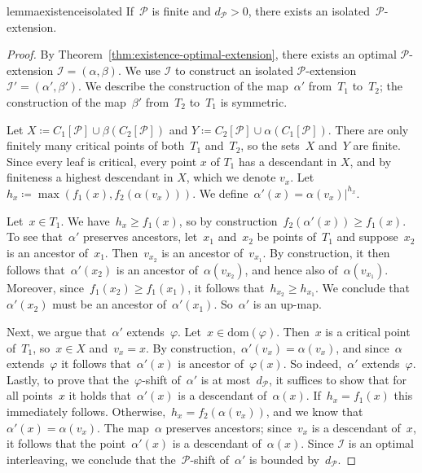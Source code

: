 \documentclass[a4paper,UKenglish, autoref, thm-restate, cleveref]{lipics-v2021}
\newcommand{\dom}{\mathrm{dom}}
\newcommand{\an}[2]{#1|^{#2}}
\newcommand{\resdist}[1]{d_{#1}}
\renewcommand{\phi}{\varphi}
\newcommand{\I}{\mathcal{I}}
\renewcommand{\P}{\mathcal{P}}
\begin{document}
\begin{restatable}{lemma}{existenceisolated}
\label{lem:existence-isolated-extension}
  If~$\P$ is finite and $\resdist{\P}>0$, there exists an isolated~$\P$-extension.
\end{restatable}
\begin{proof}
By Theorem~\ref{thm:existence-optimal-extension}, there exists an optimal $\P$-extension $\I=(\alpha,\beta)$.
We use $\I$ to construct an isolated $\P$-extension $\I'=(\alpha',\beta')$.
We describe the construction of the map~$\alpha'$ from~$T_1$ to~$T_2$; the construction of the map~$\beta'$ from~$T_2$ to~$T_1$ is symmetric.

Let $X \coloneqq C_1[\P]\cup\beta(C_2[\P])$ and $Y \coloneqq C_2[\P] \cup \alpha(C_1[\P])$.
There are only finitely many critical points of both~$T_1$ and~$T_2$, so the sets~$X$ and~$Y$ are finite.
Since every leaf is critical, every point $x$ of $T_1$ has a descendant in $X$, and by finiteness a highest descendant in $X$, which we denote $v_x$.
Let~$h_x \coloneqq \max(f_1(x), f_2(\alpha(v_x)))$.
We define~$\alpha'(x) = \an{\alpha(v_x)}{h_x}$.

\proofsubparagraph{$\alpha'$ is an up-map with~$\phi$-shift at most~$\resdist{\P}$.}
Let~$x \in T_1$.
We have~$h_x \ge f_1(x)$, so by construction~$f_2(\alpha'(x)) \ge f_1(x)$.
To see that~$\alpha'$ preserves ancestors, let~$x_1$ and~$x_2$ be points of~$T_1$ and suppose~$x_2$ is an ancestor of~$x_1$.
Then~$v_{x_2}$ is an ancestor of~$v_{x_1}$.
By construction, it then follows that~$\alpha'(x_2)$ is an ancestor of~$\alpha(v_{x_2})$, and hence also of~$\alpha(v_{x_1})$.
Moreover, since~$f_1(x_2) \ge f_1(x_1)$, it follows that~$h_{x_2} \ge h_{x_1}$.
We conclude that~$\alpha'(x_2)$ must be an ancestor of~$\alpha'(x_1)$.
So~$\alpha'$ is an up-map.

Next, we argue that~$\alpha'$ extends~$\phi$.
Let~$x \in \dom(\phi)$.
Then~$x$ is a critical point of~$T_1$, so~$x \in X$ and~$v_x = x$.
By construction,~$\alpha'(v_x) = \alpha(v_x)$, and since~$\alpha$ extends~$\phi$ it follows that~$\alpha'(x)$ is ancestor of~$\phi(x)$.
So indeed,~$\alpha'$ extends~$\phi$.
Lastly, to prove that the~$\phi$-shift of~$\alpha'$ is at most~$\resdist{\P}$, it suffices to show that for all points~$x$ it holds that~$\alpha'(x)$ is a descendant of~$\alpha(x)$.
If~$h_x = f_1(x)$ this immediately follows.
Otherwise,~$h_x = f_2(\alpha(v_x))$, and we know that~$\alpha'(x) = \alpha(v_x)$.
The map~$\alpha$ preserves ancestors; since~$v_x$ is a descendant of~$x$, it follows that the point~$\alpha'(x)$ is a descendant of~$\alpha(x)$.
Since $\I$ is an optimal interleaving, we conclude that the~$\P$-shift of~$\alpha'$ is bounded by~$\resdist{\P}$. 


\end{proof}
\end{document}

